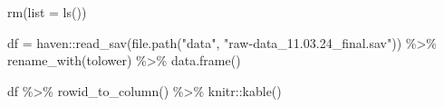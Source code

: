 \documentclass[
  letterpaper,
  DIV=11,
  numbers=noendperiod]{scrartcl}
\newenvironment{Shaded}{\begin{snugshade}}{\end{snugshade}}
\newcommand{\AttributeTok}[1]{\textcolor[rgb]{0.40,0.45,0.13}{#1}}
\newcommand{\FunctionTok}[1]{\textcolor[rgb]{0.28,0.35,0.67}{#1}}
\newcommand{\NormalTok}[1]{\textcolor[rgb]{0.00,0.23,0.31}{#1}}
\newcommand{\OtherTok}[1]{\textcolor[rgb]{0.00,0.23,0.31}{#1}}
\newcommand{\SpecialCharTok}[1]{\textcolor[rgb]{0.37,0.37,0.37}{#1}}
\newcommand{\StringTok}[1]{\textcolor[rgb]{0.13,0.47,0.30}{#1}}
\begin{document}
\begin{Shaded}
\begin{Highlighting}[]
\FunctionTok{rm}\NormalTok{(}\AttributeTok{list =} \FunctionTok{ls}\NormalTok{())}

\NormalTok{df }\OtherTok{=}\NormalTok{ haven}\SpecialCharTok{::}\FunctionTok{read\_sav}\NormalTok{(}\FunctionTok{file.path}\NormalTok{(}\StringTok{"data"}\NormalTok{, }\StringTok{"raw{-}data\_11.03.24\_final.sav"}\NormalTok{)) }\SpecialCharTok{\%\textgreater{}\%}
     \FunctionTok{rename\_with}\NormalTok{(tolower) }\SpecialCharTok{\%\textgreater{}\%}
     \FunctionTok{data.frame}\NormalTok{()}

\NormalTok{df }\SpecialCharTok{\%\textgreater{}\%}
  \FunctionTok{rowid\_to\_column}\NormalTok{() }\SpecialCharTok{\%\textgreater{}\%}
\NormalTok{   knitr}\SpecialCharTok{::}\FunctionTok{kable}\NormalTok{()}
\end{Highlighting}
\end{Shaded}
\end{document}
